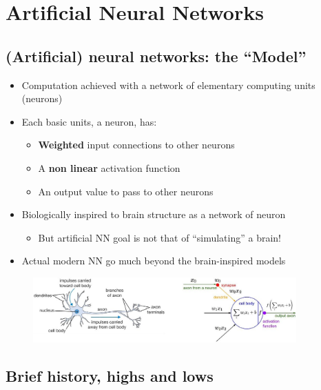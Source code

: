 \section{Artificial Neural Networks}
\subsection{(Artificial) neural networks: the “Model”}


\begin{itemize}
	\item Computation achieved with a network of elementary computing units (neurons) 
	\item Each basic units, a neuron, has:
	\begin{itemize}
		\item \textbf{Weighted} input connections to other neurons
		\item A \textbf{non linear} activation function
		\item An output value to pass to other neurons
	\end{itemize}
	\item Biologically inspired to brain structure as a network of neuron
	\begin{itemize}
		\item But artificial NN goal is not that of “simulating” a brain!
	\end{itemize}
	\item Actual modern NN go much beyond the brain-inspired models
\end{itemize}

\begin{figure}[ht]
	\centering
	\includegraphics[width=0.9\textwidth]{figure_ml/model.png}
\end{figure}
\FloatBarrier

\subsection{Brief history, highs and lows}

